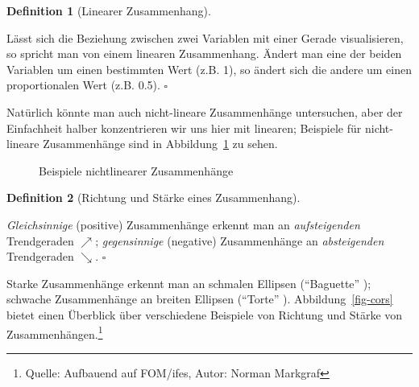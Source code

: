 \documentclass[
  letterpaper,
]{scrbook}
\theoremstyle{definition}
\theoremstyle{definition}
\newtheorem{definition}{Definition}[chapter]
\theoremstyle{definition}
\theoremstyle{remark}
\begin{document}
\begin{definition}[Linearer
Zusammenhang]\protect\hypertarget{def-lin-zshg}{}\label{def-lin-zshg}

Lässt sich die Beziehung zwischen zwei Variablen mit einer Gerade
visualisieren, so spricht man von einem linearen Zusammenhang. Ändert
man eine der beiden Variablen um einen bestimmten Wert (z.B. 1), so
ändert sich die andere um einen proportionalen Wert (z.B. 0.5).
\(\square\)

\end{definition}

Natürlich könnte man auch nicht-lineare Zusammenhänge untersuchen, aber
der Einfachheit halber konzentrieren wir uns hier mit linearen;
Beispiele für nicht-lineare Zusammenhänge sind in
Abbildung~\ref{fig-nonlinear} zu sehen.

\begin{figure}


\caption{\label{fig-nonlinear}Beispiele nichtlinearer Zusammenhänge}

\end{figure}%

\begin{definition}[Richtung und Stärke eines
Zusammenhang]\protect\hypertarget{def-zshg}{}\label{def-zshg}

\emph{Gleichsinnige} (positive) Zusammenhänge erkennt man an
\emph{aufsteigenden} Trendgeraden \(\nearrow\); \emph{gegensinnige}
(negative) Zusammenhänge an \emph{absteigenden} Trendgeraden
\(\searrow\). \(\square\)

\end{definition}

Starke Zusammenhänge erkennt man an schmalen Ellipsen (``Baguette'' );
schwache Zusammenhänge an breiten Ellipsen (``Torte'' ).
Abbildung~\ref{fig-cors} bietet einen Überblick über verschiedene
Beispiele von Richtung und Stärke von Zusammenhängen.\footnote{Quelle:
  Aufbauend auf FOM/ifes, Autor: Norman Markgraf}
\end{document}
